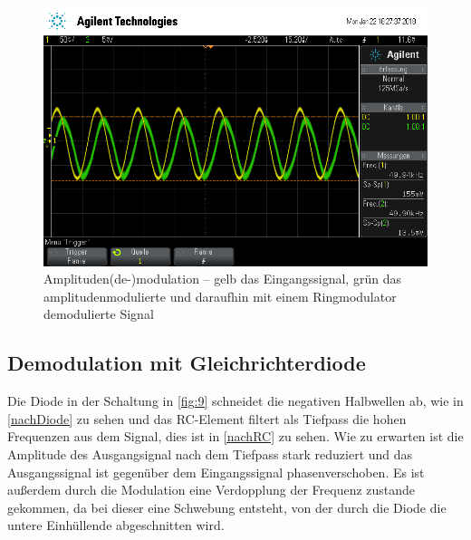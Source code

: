 \begin{figure}
	\centering
	\includegraphics[width=\textwidth]{img/f_scope_235.png}
	\caption{Amplituden(de-)modulation -- gelb das Eingangssignal, grün das amplitudenmodulierte und daraufhin mit einem Ringmodulator demodulierte Signal}
	\label{f}
\end{figure}

\subsection{Demodulation mit Gleichrichterdiode}
\label{De-AM}

Die Diode in der Schaltung in \autoref{fig:9} schneidet die negativen Halbwellen ab, wie in \autoref{nachDiode} zu sehen und das RC-Element filtert als Tiefpass die hohen Frequenzen aus dem Signal, dies ist in \autoref{nachRC} zu sehen. Wie zu erwarten ist die Amplitude des Ausgangsignal nach dem Tiefpass stark reduziert und das Ausgangssignal ist gegenüber dem Eingangssignal phasenverschoben. Es ist außerdem durch die Modulation eine Verdopplung der Frequenz zustande gekommen, da bei dieser eine Schwebung entsteht, von der durch die Diode die untere Einhüllende abgeschnitten wird.


